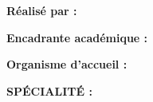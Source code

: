 \vfill

\begin{minipage}{0.9\textwidth}
\centering
\large
\textbf{Réalisé par :}\quad \authorname

\vspace{0.5cm}

\textbf{Encadrante académique :}\quad \supervisor

\vspace{0.5cm}

\textbf{Organisme d'accueil :}\quad \organism
\end{minipage}

\vspace{1.4cm}

{\large\bfseries SPÉCIALITÉ : \speciality\par}

\vspace{0.5cm}

{\large \academicyear\par}

\vspace{1cm}

\endgroup
\clearpage
